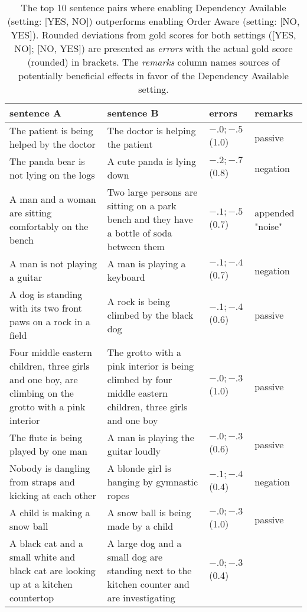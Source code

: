 \begin{table}[htb!]
	\centering
	\begin{tabularx}{\textwidth}{p{}|p{}|X|X} 
		\hline
		sentence A & sentence B & errors & remarks \\ \hline \hline
		The patient is being helped by the doctor & The doctor is helping the patient & $-.0;-.5$ (1.0) & passive \\ \hline
		The panda bear is not lying on the logs & A cute panda is lying down & $-.2;-.7$ (0.8) & negation \\ \hline
		A man and a woman are sitting comfortably on the bench & Two large persons are sitting on a park bench and they have a bottle of soda between them & $-.1;-.5$ (0.7) & appended "noise" \\ \hline
		A man is not playing a guitar & A man is playing a keyboard & $-.1;-.4$ (0.7) & negation \\ \hline
		A dog is standing with its two front paws on a rock in a field & A rock is being climbed by the black dog & $-.1;-.4$ (0.6) & passive \\ \hline
		Four middle eastern children, three girls and one boy, are climbing on the grotto with a pink interior & The grotto with a pink interior is being climbed by four middle eastern children, three girls and one boy & $-.0;-.3$ (1.0) & passive \\ \hline
		The flute is being played by one man & A man is playing the guitar loudly & $-.0;-.3$ (0.6) & passive \\ \hline
		Nobody is dangling from straps and kicking at each other & A blonde girl is hanging by gymnastic ropes & $-.1;-.4$ (0.4) & negation \\ \hline
		A child is making a snow ball & A snow ball is being made by a child & $-.0;-.3$ (1.0) & passive \\ \hline
		A black cat and a small white and black cat are looking up at a kitchen countertop & A large dog and a small dog are standing next to the kitchen counter and are investigating & $-.0;-.3$ (0.4) &  \\
		\hline \hline	
	\end{tabularx}
	\caption{The top 10 sentence pairs where enabling Dependency Available (setting: [YES, NO]) outperforms enabling Order Aware (setting: [NO, YES]). Rounded deviations from gold scores for both settings ([YES, NO]; [NO, YES]) are presented as \textit{errors} with the actual gold score (rounded) in brackets. The \textit{remarks} column names sources of potentially beneficial effects in favor of the Dependency Available setting.}
	\label{tab:results_benefit_DA}
\end{table}



